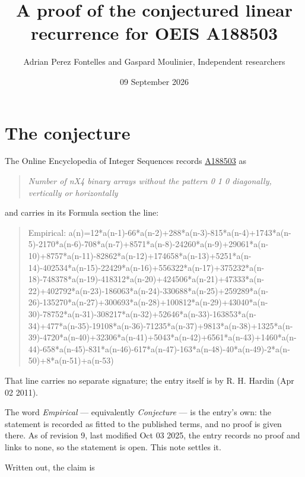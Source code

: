 \documentclass[11pt]{article}
\title{A proof of the conjectured linear recurrence for OEIS A188503}
\author{Adrian Perez Fontelles and Gaspard Moulinier, Independent researchers}
\date{09 September 2026}
\theoremstyle{definition}
\begin{document}
\maketitle
\section{The conjecture}

The Online Encyclopedia of Integer Sequences records \href{https://oeis.org/A188503}{A188503} as

\begin{quote}\itshape Number of nX4 binary arrays without the pattern 0 1 0 diagonally, vertically or horizontally\end{quote}

and carries in its Formula section the line:

\begin{quote}\ttfamily Empirical: a(n)=12*a(n-1)-66*a(n-2)+288*a(n-3)-815*a(n-4)+1743*a(n-5)-2170*a(n-6)-708*a(n-7)+8571*a(n-8)-24260*a(n-9)+29061*a(n-10)+8757*a(n-11)-82862*a(n-12)+174658*a(n-13)+5251*a(n-14)-402534*a(n-15)-22429*a(n-16)+556322*a(n-17)+375232*a(n-18)-748378*a(n-19)-418312*a(n-20)+424506*a(n-21)+47333*a(n-22)+402792*a(n-23)-186063*a(n-24)-330688*a(n-25)+259289*a(n-26)-135270*a(n-27)+300693*a(n-28)+100812*a(n-29)+43040*a(n-30)-78752*a(n-31)-308217*a(n-32)+52646*a(n-33)-163853*a(n-34)+477*a(n-35)-19108*a(n-36)-71235*a(n-37)+9813*a(n-38)+1325*a(n-39)-4720*a(n-40)+32306*a(n-41)+5043*a(n-42)+6561*a(n-43)+1460*a(n-44)-658*a(n-45)-831*a(n-46)-617*a(n-47)-163*a(n-48)-40*a(n-49)-2*a(n-50)+8*a(n-51)+a(n-53)\end{quote}

That line carries no separate signature; the entry itself is by R. H. Hardin (Apr 02 2011).

The word {\itshape Empirical} --- equivalently {\itshape Conjecture} --- is the entry's own: the statement is recorded as fitted to the published terms, and no proof is given there. As of revision 9, last modified Oct 03 2025, the entry records no proof and links to none, so the statement is open. This note settles it.

Written out, the claim is
\end{document}
